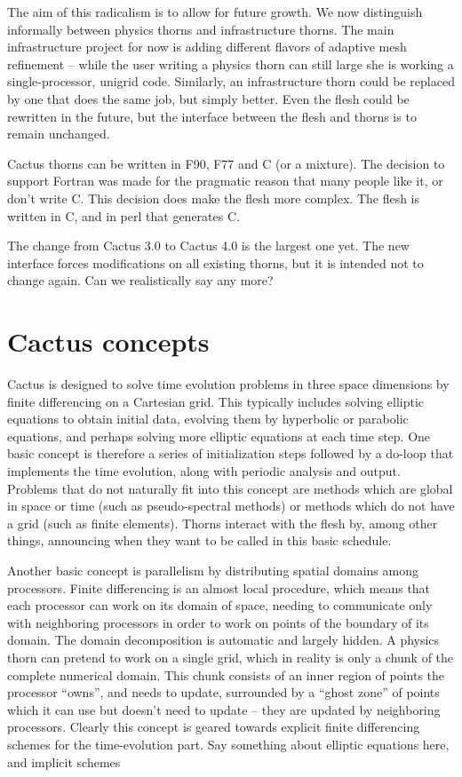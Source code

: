 The aim of this radicalism is to allow for future growth. We now
distinguish informally between physics thorns and infrastructure
thorns. The main infrastructure project for now is adding different
flavors of adaptive mesh refinement -- while the user writing a
physics thorn can still large she is working a single-processor,
unigrid code. Similarly, an infrastructure thorn could be replaced by
one that does the same job, but simply better. Even the flesh could be
rewritten in the future, but the interface between the flesh and
thorns is to remain unchanged.

Cactus thorns can be written in F90, F77 and C (or a mixture). The
decision to support Fortran was made for the pragmatic reason that
many people like it, or don't write C. This decision does make the
flesh more complex. The flesh is written in C, and in perl that
generates C.

The change from Cactus 3.0 to Cactus 4.0 is the largest one yet. The
new interface forces modifications on all existing thorns, but it is
intended not to change again. {\q Can we realistically say any more?}


\chapter{Cactus concepts} 

Cactus is designed to solve time evolution problems in three space
dimensions by finite differencing on a Cartesian grid. This typically
includes solving elliptic equations to obtain initial data, evolving
them by hyperbolic or parabolic equations, and perhaps solving more
elliptic equations at each time step.  One basic concept is therefore
a series of initialization steps followed by a do-loop that implements
the time evolution, along with periodic analysis and output. Problems
that do not naturally fit into this concept are methods which are
global in space or time (such as pseudo-spectral methods) or methods
which do not have a grid (such as finite elements). Thorns interact
with the flesh by, among other things, announcing when they want to be
called in this basic schedule.

Another basic concept is parallelism by distributing spatial domains
among processors. Finite differencing is an almost local procedure,
which means that each processor can work on its domain of space,
needing to communicate only with neighboring processors in order to
work on points of the boundary of its domain. The domain decomposition
is automatic and largely hidden. A physics thorn can pretend to work
on a single grid, which in reality is only a chunk of the complete
numerical domain. This chunk consists of an inner region of points the
processor ``owns'', and needs to update, surrounded by a ``ghost
zone'' of points which it can use but doesn't need to update -- they
are updated by neighboring processors. Clearly this concept is geared
towards explicit finite differencing schemes for the time-evolution
part. {\q Say something about elliptic equations here, and implicit
schemes}

